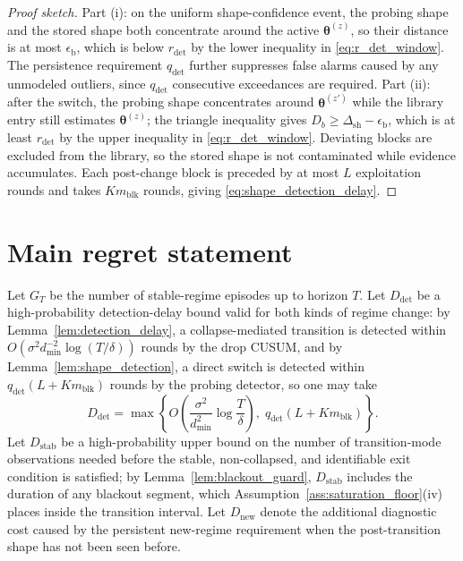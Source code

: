 \documentclass[11pt]{article}
\begin{document}
\begin{proof}[Proof sketch]
Part (i): on the uniform shape-confidence event, the probing shape and the stored shape both concentrate around the active $\bm\theta^{(z)}$, so their distance is at most $\epsilon_{\mathrm{b}}$, which is below $r_{\mathrm{det}}$ by the lower inequality in \eqref{eq:r_det_window}. The persistence requirement $q_{\mathrm{det}}$ further suppresses false alarms caused by any unmodeled outliers, since $q_{\mathrm{det}}$ consecutive exceedances are required. Part (ii): after the switch, the probing shape concentrates around $\bm\theta^{(z')}$ while the library entry still estimates $\bm\theta^{(z)}$; the triangle inequality gives $D_b\geq\Delta_{\mathrm{sh}}-\epsilon_{\mathrm{b}}$, which is at least $r_{\mathrm{det}}$ by the upper inequality in \eqref{eq:r_det_window}. Deviating blocks are excluded from the library, so the stored shape is not contaminated while evidence accumulates. Each post-change block is preceded by at most $L$ exploitation rounds and takes $Km_{\mathrm{blk}}$ rounds, giving \eqref{eq:shape_detection_delay}.
\end{proof}

\section{Main regret statement}
\label{sec:main_regret}

Let $G_T$ be the number of stable-regime episodes up to horizon $T$. Let $D_{\mathrm{det}}$ be a high-probability detection-delay bound valid for both kinds of regime change: by Lemma~\ref{lem:detection_delay}, a collapse-mediated transition is detected within $O\!\left(\sigma^2 d_{\min}^{-2}\log(T/\delta)\right)$ rounds by the drop CUSUM, and by Lemma~\ref{lem:shape_detection}, a direct switch is detected within $q_{\mathrm{det}}(L+Km_{\mathrm{blk}})$ rounds by the probing detector, so one may take
\begin{equation}
\label{eq:combined_detection_delay}
D_{\mathrm{det}}
=
\max\left\{
O\!\left(\frac{\sigma^2}{d_{\min}^2}\log\frac{T}{\delta}\right),
\;
q_{\mathrm{det}}\left(L+Km_{\mathrm{blk}}\right)
\right\}.
\end{equation}
Let $D_{\mathrm{stab}}$ be a high-probability upper bound on the number of transition-mode observations needed before the stable, non-collapsed, and identifiable exit condition is satisfied; by Lemma~\ref{lem:blackout_guard}, $D_{\mathrm{stab}}$ includes the duration of any blackout segment, which Assumption~\ref{ass:saturation_floor}(iv) places inside the transition interval. Let $D_{\mathrm{new}}$ denote the additional diagnostic cost caused by the persistent new-regime requirement when the post-transition shape has not been seen before.
\end{document}
